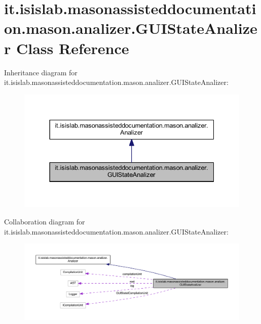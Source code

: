 \hypertarget{classit_1_1isislab_1_1masonassisteddocumentation_1_1mason_1_1analizer_1_1_g_u_i_state_analizer}{\section{it.\-isislab.\-masonassisteddocumentation.\-mason.\-analizer.\-G\-U\-I\-State\-Analizer Class Reference}
\label{classit_1_1isislab_1_1masonassisteddocumentation_1_1mason_1_1analizer_1_1_g_u_i_state_analizer}
}


Inheritance diagram for it.\-isislab.\-masonassisteddocumentation.\-mason.\-analizer.\-G\-U\-I\-State\-Analizer\-:
\nopagebreak
\begin{figure}[H]
\begin{center}
\leavevmode
\includegraphics[width=337pt]{classit_1_1isislab_1_1masonassisteddocumentation_1_1mason_1_1analizer_1_1_g_u_i_state_analizer__inherit__graph}
\end{center}
\end{figure}


Collaboration diagram for it.\-isislab.\-masonassisteddocumentation.\-mason.\-analizer.\-G\-U\-I\-State\-Analizer\-:
\nopagebreak
\begin{figure}[H]
\begin{center}
\leavevmode
\includegraphics[width=350pt]{classit_1_1isislab_1_1masonassisteddocumentation_1_1mason_1_1analizer_1_1_g_u_i_state_analizer__coll__graph}
\end{center}
\end{figure}
